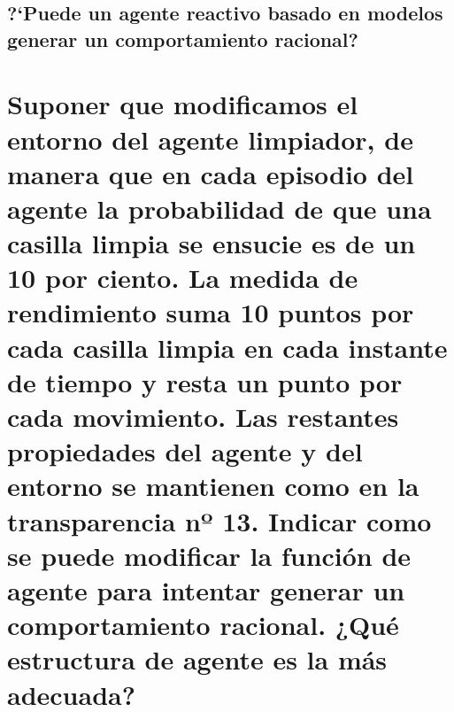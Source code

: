 \documentclass[10pt, a4paper,spanish]{article}
\begin{document}
		\subsection{?`Puede un agente reactivo basado en modelos generar un comportamiento racional?}

			\paragraph{}



	\section{Suponer que modificamos el entorno del agente limpiador, de manera que en cada episodio del agente la probabilidad de que una casilla limpia se ensucie es de un 10 por ciento. La medida de rendimiento suma 10 puntos por cada casilla limpia en cada instante de tiempo y resta un punto por cada movimiento. Las restantes propiedades del agente y del entorno se mantienen como en la transparencia nº 13. Indicar como se puede modificar la función de agente para intentar generar un comportamiento racional. ¿Qué estructura de agente es la más adecuada?}

		\paragraph{}
\end{document}
